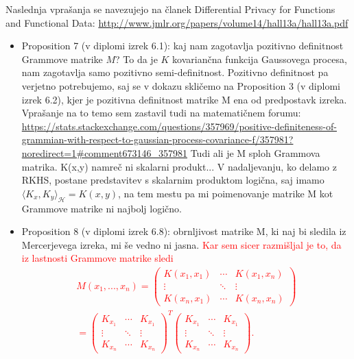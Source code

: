 \documentclass[12pt,a4paper]{amsart}
\theoremstyle{definition} %
\theoremstyle{plain} %
\begin{document}
Naslednja vprašanja se navezujejo na članek Differential Privacy for Functions and Functional Data: \url{http://www.jmlr.org/papers/volume14/hall13a/hall13a.pdf}
\newline
\begin{itemize}
\item Proposition 7 (v diplomi izrek 6.1): kaj nam zagotavlja pozitivno definitnost Grammove matrike $M$? To da je $K$ kovariančna funkcija Gaussovega procesa, nam zagotavlja samo pozitivno semi-definitnost. Pozitivno definitnost pa verjetno potrebujemo, saj se v dokazu skličemo na Proposition 3 (v diplomi izrek 6.2), kjer je pozitivna definitnost matrike M ena od predpostavk izreka. Vprašanje na to temo sem zastavil tudi na matematičnem forumu: \url{https://stats.stackexchange.com/questions/357969/positive-definiteness-of-grammian-with-respect-to-gaussian-process-covariance-f/357981?noredirect=1#comment673146_357981}
\newline
\newline
Tudi ali je M sploh Grammova matrika. K(x,y) namreč ni skalarni produkt... V nadaljevanju, ko delamo z RKHS, postane predstavitev s skalarnim produktom logična, saj imamo $\langle K_x, K_y \rangle_{\mathcal{H}} = K(x,y)$, na tem mestu pa mi poimenovanje matrike M kot Grammove matrike ni najbolj logično.
\newline
\item Proposition 8  (v diplomi izrek 6.8): obrnljivost matrike M, ki naj bi sledila iz Mercerjevega izreka, mi še vedno ni jasna. \textcolor{red}{Kar sem sicer razmišljal je to, da iz lastnosti Grammove matrike sledi 
\begin{gather*}
M(x_1,...,x_n) = 
 \begin{pmatrix}
  K(x_1,x_1) & \cdots & K(x_1,x_n) \\
  \vdots    & \ddots & \vdots  \\
  K(x_n,x_1) & \cdots & K(x_n,x_n) 
 \end{pmatrix} \\ = 
  \begin{pmatrix}
  K_{x_1} & \cdots & K_{x_1} \\
  \vdots    & \ddots & \vdots  \\
  K_{x_n} & \cdots & K_{x_n} 
 \end{pmatrix}^T 
  \begin{pmatrix}
  K_{x_1} & \cdots & K_{x_1} \\
  \vdots    & \ddots & \vdots  \\
  K_{x_n} & \cdots & K_{x_n} 
 \end{pmatrix}.

\end{gather*}}
\end{itemize}
\end{document}

